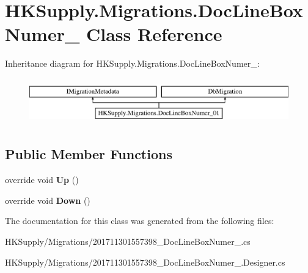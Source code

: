 \hypertarget{class_h_k_supply_1_1_migrations_1_1_doc_line_box_numer__01}{}\section{H\+K\+Supply.\+Migrations.\+Doc\+Line\+Box\+Numer\+\_ Class Reference}
\label{class_h_k_supply_1_1_migrations_1_1_doc_line_box_numer__01}
Inheritance diagram for H\+K\+Supply.\+Migrations.\+Doc\+Line\+Box\+Numer\+\_\+:\begin{figure}[H]
\begin{center}
\leavevmode
\includegraphics[height=2.000000cm]{class_h_k_supply_1_1_migrations_1_1_doc_line_box_numer__01}
\end{center}
\end{figure}
\subsection*{Public Member Functions}
\begin{DoxyCompactItemize}
\item 
\mbox{\label{class_h_k_supply_1_1_migrations_1_1_doc_line_box_numer__01_aec16d5fb2cb63ecd8b2195e9d6a002fb}} 
override void {\bfseries Up} ()
\item 
\mbox{\label{class_h_k_supply_1_1_migrations_1_1_doc_line_box_numer__01_a4c42902097e7bb695396fa4f4b107e57}} 
override void {\bfseries Down} ()
\end{DoxyCompactItemize}


The documentation for this class was generated from the following files\+:\begin{DoxyCompactItemize}
\item 
H\+K\+Supply/\+Migrations/201711301557398\+\_\+\+Doc\+Line\+Box\+Numer\+\_.\+cs\item 
H\+K\+Supply/\+Migrations/201711301557398\+\_\+\+Doc\+Line\+Box\+Numer\+\_.\+Designer.\+cs\end{DoxyCompactItemize}
